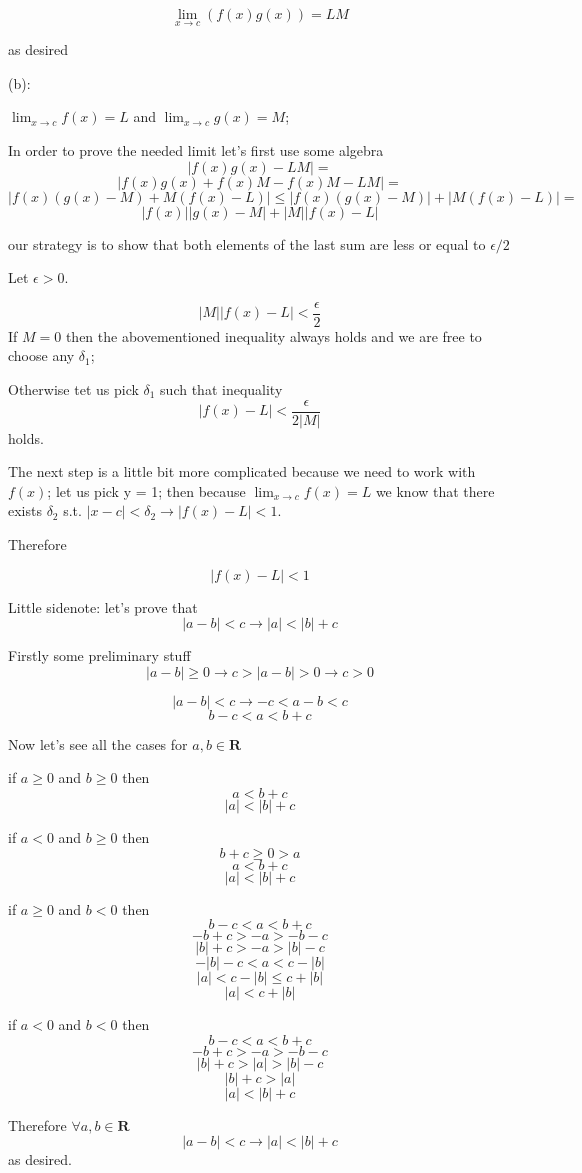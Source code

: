 \documentclass[11pt,oneside,titlepage]{book}
\begin{document}
$$\lim_{x \to c}(f(x)g(x)) = L M $$

as desired

(b):

$\lim_{x \to c} f(x) = L$ and $\lim_{x \to c} g(x) = M$;

In  order to prove the needed limit let's first use some algebra
$$ |f(x)g(x) - LM| = $$
$$ |f(x)g(x) + f(x)M - f(x)M - LM| = $$
$$|f(x)(g(x) - M) + M(f(x) - L)| \leq
|f(x)(g(x) - M)| + | M(f(x) - L)| = $$
$$|f(x)||g(x) - M| + |M||f(x) - L|  $$

our strategy is to show that both elements of the last sum are less or equal to $\epsilon/2$

Let $\epsilon > 0$.

$$ |M||f(x) - L| < \frac{\epsilon}{2}$$
If $M = 0$ then the abovementioned inequality always holds and we are free to choose any $\delta_1$;

Otherwise tet us pick $\delta_1$ such that inequality
$$ |f(x) - L| < \frac{\epsilon}{2|M|}$$
holds.

The next step is a little bit more complicated because we need to work with $f(x)$; let us pick y = 1;
then because $\lim_{x \to c}f(x) = L$ we know that there exists $\delta_2$ s.t. $|x - c| < \delta_2
\to |f(x) - L| < 1$. 

Therefore

$$|f(x) - L| < 1$$

Little sidenote: let's prove that 
$$ |a - b| < c \to |a| < |b| + c  $$

Firstly some preliminary stuff
$$|a - b| \geq 0 \to c > |a - b| > 0 \to c > 0$$

$$|a - b| < c \to -c < a - b < c$$
$$b -c < a  < b + c$$

Now let's see all the cases for $a, b \in \textbf{R}$

if $a \geq 0$ and $b \geq 0$ then
$$a < b + c$$
$$|a| < |b| + c$$

if $a < 0$ and $b \geq 0$ then
$$ b + c \geq 0 > a$$
$$a < b + c$$
$$|a| < |b| + c$$

if $a \geq 0$ and $b < 0$ then
$$b -c < a  < b + c$$
$$-b +c > -a  > -b - c$$
$$|b| +c > -a  > |b| - c$$
$$-|b| - c  < a  <  c - |b|$$
$$|a|  <  c - |b| \leq c + |b|$$
$$|a|  <  c + |b|$$

if $a < 0$ and $b < 0$ then
$$b -c < a  < b + c$$
$$-b + c > -a  > -b - c$$
$$|b| + c > |a|  > |b| - c$$
$$|b| + c > |a|$$
$$|a| < |b| + c$$

Therefore $\forall a,b\in \textbf{R}$
$$|a - b| < c \to |a| < |b| + c$$
as desired.
\end{document}

